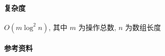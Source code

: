 \paragraph{复杂度} \(O(m\log^2 n)\), 其中 \(m\) 为操作总数, \(n\) 为数组长度

\paragraph{参考资料} \cite{ruyi2016segbeats}